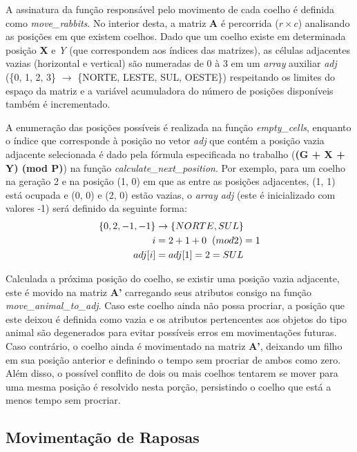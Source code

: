 \documentclass[a4paper, 12pt]{article}
\begin{document}
A assinatura da função responsável pelo movimento de cada coelho é definida como \emph{move\_rabbits}. No interior desta, a matriz \textbf{A} é percorrida (\(r \times c\)) analisando as posições em que existem coelhos. Dado que um coelho existe em determinada posição \textbf{X} e \emph{Y} (que correspondem aos índices das matrizes), as células adjacentes vazias (horizontal e vertical) são numeradas de 0 à 3 em um \emph{array} auxiliar \emph{adj} (\{0, 1, 2, 3\} \(\rightarrow\) \{NORTE, LESTE, SUL, OESTE\}) respeitando os limites do espaço da matriz e a variável acumuladora do número de posições disponíveis também é incrementado.

A enumeração das posições possíveis é realizada na função \emph{empty\_cells}, enquanto o índice que corresponde à posição no vetor \emph{adj} que contém a posição vazia adjacente selecionada é dado pela fórmula especificada no trabalho (\textbf{(G + X + Y) (mod P)}) na função \emph{calculate\_next\_position}. Por exemplo, para um coelho na geração 2 e na posição (1, 0) em que as entre as posições adjacentes, (1, 1) está ocupada e (0, 0) e (2, 0) estão vazias, o \emph{array} \emph{adj} (este é inicializado com valores -1) será definido da seguinte forma:
\begin{align*}
    \{0, 2, -1, -1\} & \rightarrow \{NORTE, SUL\}\\
    i & = 2 + 1 + 0 \hspace{0.2cm}(mod 2) = 1\\
    adj[i] & = adj[1] = 2 = SUL
\end{align*}

Calculada a próxima posição do coelho, se existir uma posição vazia adjacente, este é movido na matriz \textbf{A'} carregando seus atributos consigo na função \emph{move\_animal\_to\_adj}. Caso este coelho ainda não possa procriar, a posição que este deixou é definida como vazia e os atributos pertencentes aos objetos do tipo animal são degenerados para evitar possíveis erros em movimentações futuras. Caso contrário, o coelho ainda é movimentado na matriz \textbf{A'}, deixando um filho em sua posição anterior e definindo o tempo sem procriar de ambos como zero. Além disso, o possível conflito de dois ou mais coelhos tentarem se mover para uma mesma posição é resolvido nesta porção, persistindo o coelho que está a menos tempo sem procriar.

\subsection{Movimentação de Raposas}
\end{document}
